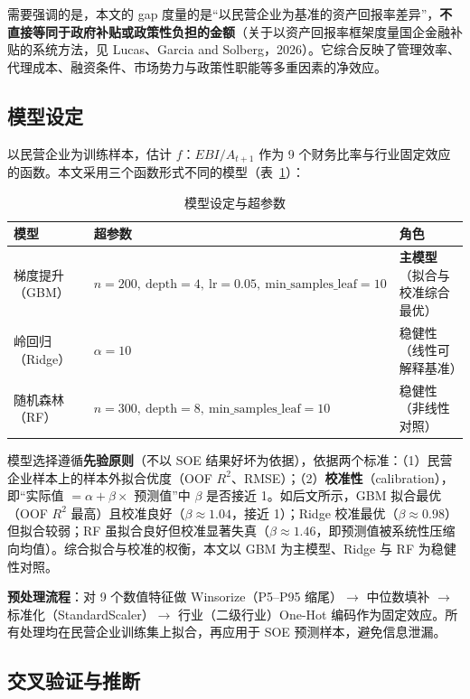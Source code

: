 \documentclass[11pt,a4paper]{ctexart}
\begin{document}
需要强调的是，本文的 gap 度量的是“以民营企业为基准的资产回报率差异”，\textbf{不直接等同于政府补贴或政策性负担的金额}（关于以资产回报率框架度量国企金融补贴的系统方法，见 Lucas、Garcia and Solberg，2026）。它综合反映了管理效率、代理成本、融资条件、市场势力与政策性职能等多重因素的净效应。

\subsection{模型设定}

以民营企业为训练样本，估计 $f$：$EBI/A_{t+1}$ 作为 9 个财务比率与行业固定效应的函数。本文采用三个函数形式不同的模型（表~\ref{tab:models}）：

\begin{table}[htbp]
\centering
\caption{模型设定与超参数}
\label{tab:models}
\begin{threeparttable}
\small
\begin{tabular}{lll}
\toprule
模型 & 超参数 & 角色 \\
\midrule
梯度提升（GBM） & $n=200,\ \text{depth}=4,\ \text{lr}=0.05,\ \text{min\_samples\_leaf}=10$ & \textbf{主模型}（拟合与校准综合最优） \\
岭回归（Ridge） & $\alpha=10$ & 稳健性（线性可解释基准） \\
随机森林（RF） & $n=300,\ \text{depth}=8,\ \text{min\_samples\_leaf}=10$ & 稳健性（非线性对照） \\
\bottomrule
\end{tabular}
\end{threeparttable}
\end{table}

模型选择遵循\textbf{先验原则}（不以 SOE 结果好坏为依据），依据两个标准：（1）民营企业样本上的样本外拟合优度（OOF $R^2$、RMSE）；（2）\textbf{校准性}（calibration），即“实际值 $=\alpha+\beta\times$ 预测值”中 $\beta$ 是否接近 1。如后文所示，GBM 拟合最优（OOF $R^2$ 最高）且校准良好（$\beta\approx1.04$，接近 1）；Ridge 校准最优（$\beta\approx0.98$）但拟合较弱；RF 虽拟合良好但校准显著失真（$\beta\approx1.46$，即预测值被系统性压缩向均值）。综合拟合与校准的权衡，本文以 GBM 为主模型、Ridge 与 RF 为稳健性对照。

\textbf{预处理流程}：对 9 个数值特征做 Winsorize（P5--P95 缩尾）$\to$ 中位数填补 $\to$ 标准化（StandardScaler）$\to$ 行业（二级行业）One-Hot 编码作为固定效应。所有处理均在民营企业训练集上拟合，再应用于 SOE 预测样本，避免信息泄漏。

\subsection{交叉验证与推断}
\end{document}
